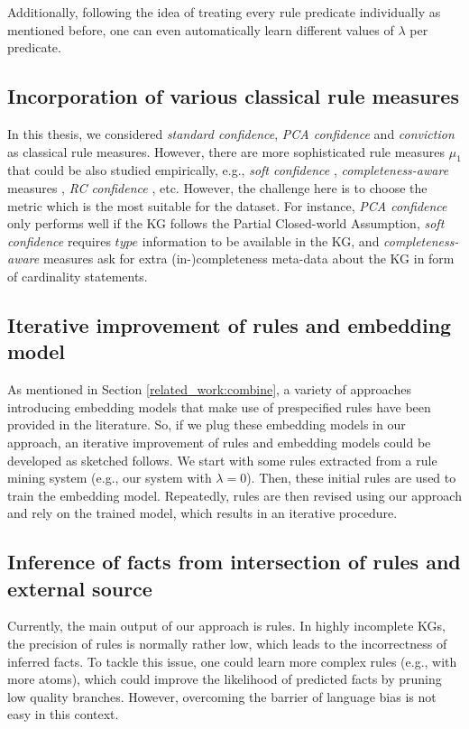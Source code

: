 Additionally, following the idea of treating every rule predicate individually as mentioned before, one can even automatically learn different values of $\lambda$ per predicate.

\subsection{Incorporation of various classical rule measures}
In this thesis, we considered \textit{standard confidence}, \textit{PCA confidence} and \textit{conviction} as classical rule measures. However, there are more sophisticated rule measures $\mu_1$ that could be also studied empirically, e.g., \textit{soft confidence} \cite{rdf2rules}, \textit{completeness-aware} measures \cite{carl}, \textit{RC confidence} \cite{measureskg}, etc. However, the challenge here is to choose the metric which is the most suitable for the dataset. For instance, \textit{PCA confidence} only performs well if the KG follows the Partial Closed-world Assumption, \textit{soft confidence} requires $type$ information to be available in the KG, and \textit{completeness-aware} measures ask for extra (in-)completeness meta-data about the KG in form of cardinality statements.

\subsection{Iterative improvement of rules and embedding model}
As mentioned in Section \ref{related_work:combine}, a variety of approaches introducing embedding models that make use of prespecified rules have been provided in the literature. So, if we plug these embedding models in our approach, an iterative improvement of rules and embedding models could be developed as sketched follows. We start with some rules extracted from a rule mining system (e.g., our system with $\lambda = 0$). Then, these initial rules are used to train the embedding model. Repeatedly, rules are then revised using our approach and rely on the trained model, which results in an iterative procedure.

\subsection{Inference of facts from intersection of rules and external source}
Currently, the main output of our approach is rules. In highly incomplete KGs, the precision of rules is normally rather low, which leads to the incorrectness of inferred facts. To tackle this issue, one could learn more complex rules (e.g., with more atoms), which could improve the likelihood of predicted facts by pruning low quality branches. However, overcoming the barrier of language bias is not easy in this context.

